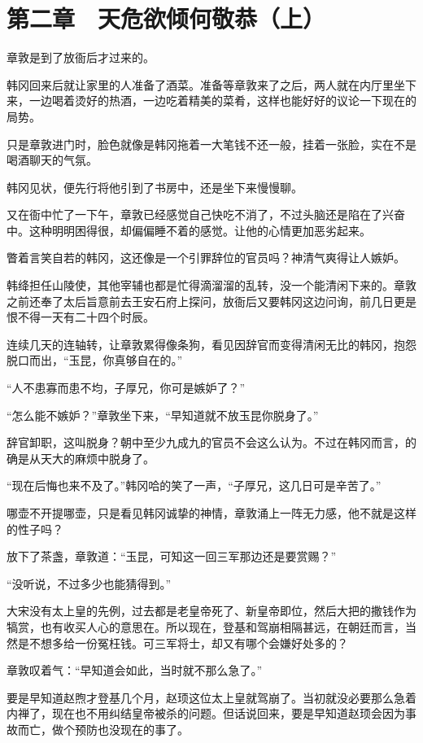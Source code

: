 \section{第二章　天危欲倾何敬恭（上）}

章敦是到了放衙后才过来的。

韩冈回来后就让家里的人准备了酒菜。准备等章敦来了之后，两人就在内厅里坐下来，一边喝着烫好的热酒，一边吃着精美的菜肴，这样也能好好的议论一下现在的局势。

只是章敦进门时，脸色就像是韩冈拖着一大笔钱不还一般，挂着一张脸，实在不是喝酒聊天的气氛。

韩冈见状，便先行将他引到了书房中，还是坐下来慢慢聊。

又在衙中忙了一下午，章敦已经感觉自己快吃不消了，不过头脑还是陷在了兴奋中。这种明明困得很，却偏偏睡不着的感觉。让他的心情更加恶劣起来。

瞥着言笑自若的韩冈，这还像是一个引罪辞位的官员吗？神清气爽得让人嫉妒。

韩绛担任山陵使，其他宰辅也都是忙得滴溜溜的乱转，没一个能清闲下来的。章敦之前还奉了太后旨意前去王安石府上探问，放衙后又要韩冈这边问询，前几日更是恨不得一天有二十四个时辰。

连续几天的连轴转，让章敦累得像条狗，看见因辞官而变得清闲无比的韩冈，抱怨脱口而出，“玉昆，你真够自在的。”

“人不患寡而患不均，子厚兄，你可是嫉妒了？”

“怎么能不嫉妒？”章敦坐下来，“早知道就不放玉昆你脱身了。”

辞官卸职，这叫脱身？朝中至少九成九的官员不会这么认为。不过在韩冈而言，的确是从天大的麻烦中脱身了。

“现在后悔也来不及了。”韩冈哈的笑了一声，“子厚兄，这几日可是辛苦了。”

哪壶不开提哪壶，只是看见韩冈诚挚的神情，章敦涌上一阵无力感，他不就是这样的性子吗？

放下了茶盏，章敦道：“玉昆，可知这一回三军那边还是要赏赐？”

“没听说，不过多少也能猜得到。”

大宋没有太上皇的先例，过去都是老皇帝死了、新皇帝即位，然后大把的撒钱作为犒赏，也有收买人心的意思在。所以现在，登基和驾崩相隔甚远，在朝廷而言，当然是不想多给一份冤枉钱。可三军将士，却又有哪个会嫌好处多的？

章敦叹着气：“早知道会如此，当时就不那么急了。”

要是早知道赵煦才登基几个月，赵顼这位太上皇就驾崩了。当初就没必要那么急着内禅了，现在也不用纠结皇帝被杀的问题。但话说回来，要是早知道赵顼会因为事故而亡，做个预防也没现在的事了。

